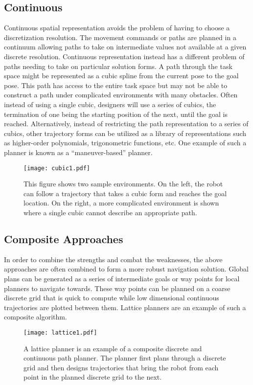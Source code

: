 \subsection{Continuous}
Continuous spatial representation avoids the problem of having to choose a discretization resolution. The movement commands or paths
are planned in a continuum allowing paths to take on intermediate values not available at a given discrete resolution.
Continuous representation instead has a different problem of paths needing to take on particular solution forms. A path
through the task space might be represented as a cubic spline from the current pose to the goal pose. This path has access
to the entire task space but may not be able to construct a path under complicated environments with many obstacles. Often
instead of using a single cubic, designers will use a series of cubics, the termination of one being the starting
position of the next, until the goal is reached. 
Alternatively, instead of restricting the path representation to a series of cubics, other trajectory forms can be
utilized as a library of representations such as higher-order polynomials, trigonometric functions, etc.
One example of such a planner is known as a ``maneuver-based'' planner.
\begin{figure}
\centering
\texttt{[image: cubic1.pdf]}
\caption{This figure shows two sample environments. On the left, the robot can follow a trajectory that takes
	     a cubic form and reaches the goal location. On the right, a more complicated environment is shown where a single 
	     cubic cannot describe an appropriate path.}
\label{fig:cubic1}
\end{figure}

\subsection{Composite Approaches}
In order to combine the strengths and combat the weaknesses, the above approaches are often combined to form a more robust
navigation solution. Global plans can be generated as a series of intermediate goals or way points for local planners to 
navigate towards. These way points can be planned on a coarse discrete grid that is quick to compute while low dimensional
continuous trajectories are plotted between them. Lattice planners are an example of such a composite algorithm. 
\begin{figure}
\centering
\texttt{[image: lattice1.pdf]}
\caption{A lattice planner is an example of a composite discrete and continuous path planner. The planner
         first plans through a discrete grid and then designs trajectories that bring the robot from each point in the planned discrete grid to the next.}
\label{fig:lattice1}
\end{figure}

